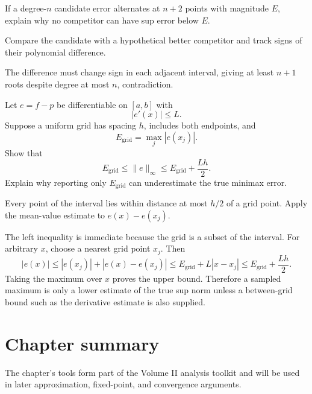 \begin{exercise}\label{exr:ii22-expand-16}
If a degree-\(n\) candidate error alternates at \(n+2\) points with magnitude \(E\), explain why no competitor can have sup error below \(E\).
\end{exercise}
\begin{hint}
Compare the candidate with a hypothetical better competitor and track signs of their polynomial difference.
\end{hint}
\begin{solution}
The difference must change sign in each adjacent interval, giving at least \(n+1\) roots despite degree at most \(n\), contradiction.
\end{solution}
\begin{exercise}\label{exr:ii22-numerical-grid-01}
Let \(e=f-p\) be differentiable on \([a,b]\) with
\[
|e'(x)|\le L.
\]
Suppose a uniform grid has spacing \(h\), includes both endpoints, and
\[
E_{\mathrm{grid}}=\max_j |e(x_j)|.
\]
Show that
\[
E_{\mathrm{grid}}
\le
\|e\|_{\infty}
\le
E_{\mathrm{grid}}+\frac{Lh}{2}.
\]
Explain why reporting only \(E_{\mathrm{grid}}\) can underestimate the true
minimax error.
\end{exercise}
\begin{hint}
Every point of the interval lies within distance at most \(h/2\) of a grid
point.  Apply the mean-value estimate to \(e(x)-e(x_j)\).
\end{hint}
\begin{solution}
The left inequality is immediate because the grid is a subset of the interval.
For arbitrary \(x\), choose a nearest grid point \(x_j\).  Then
\[
|e(x)|
\le
|e(x_j)|+|e(x)-e(x_j)|
\le
E_{\mathrm{grid}}+L|x-x_j|
\le
E_{\mathrm{grid}}+\frac{Lh}{2}.
\]
Taking the maximum over \(x\) proves the upper bound.  Therefore a sampled
maximum is only a lower estimate of the true sup norm unless a between-grid
bound such as the derivative estimate is also supplied.
\end{solution}
\section*{Chapter summary}
The chapter's tools form part of the Volume II analysis toolkit and will be used in later approximation, fixed-point, and convergence arguments.

